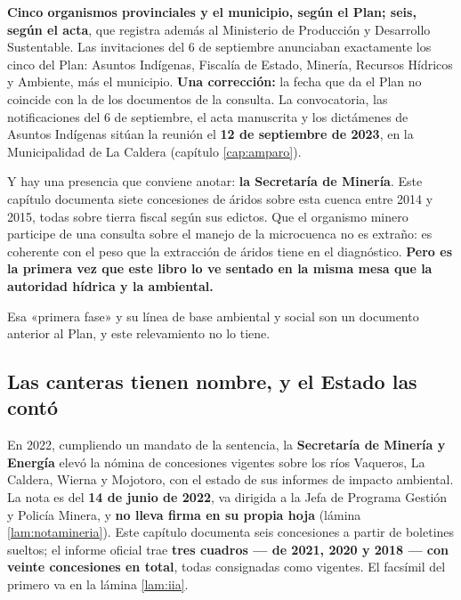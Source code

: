 \textbf{Cinco organismos provinciales y el municipio, según el Plan; seis, según el acta}, que registra además al Ministerio de Producción y Desarrollo Sustentable. Las invitaciones del 6 de septiembre anunciaban exactamente los cinco del Plan: Asuntos Indígenas, Fiscalía de Estado, Minería, Recursos Hídricos y Ambiente, más el municipio. \textbf{Una corrección:} la fecha que da el Plan no coincide con la de los documentos de la consulta. La convocatoria, las notificaciones del 6 de septiembre, el acta manuscrita y los dictámenes de Asuntos Indígenas sitúan la reunión el \textbf{12 de septiembre de 2023}, en la Municipalidad de La Caldera (capítulo \ref{cap:amparo}).

Y hay una presencia que conviene anotar: \textbf{la Secretaría de Minería}. Este capítulo
documenta siete concesiones de áridos sobre esta cuenca entre 2014 y 2015, todas sobre tierra fiscal según sus edictos. Que el organismo minero participe de una consulta sobre el manejo de la
microcuenca no es extraño: es coherente con el peso que la extracción de áridos tiene en el
diagnóstico. \textbf{Pero es la primera vez que este libro lo ve sentado en la misma mesa que
la autoridad hídrica y la ambiental.}

Esa «primera fase» y su línea de base ambiental y social son un documento anterior al Plan,
y este relevamiento no lo tiene.

\subsection*{Las canteras tienen nombre, y el Estado las contó}

En 2022, cumpliendo un mandato de la sentencia, la \textbf{Secretaría de Minería y Energía}
elevó la nómina de concesiones vigentes sobre los ríos Vaqueros, La Caldera, Wierna y
Mojotoro, con el estado de sus informes de impacto ambiental. La nota es del \textbf{14 de
junio de 2022}, va dirigida a la Jefa de Programa Gestión y Policía Minera, y \textbf{no lleva
firma en su propia hoja} (lámina \ref{lam:notamineria}). Este capítulo documenta seis
concesiones a partir de boletines sueltos; el informe oficial trae \textbf{tres cuadros --- de
2021, 2020 y 2018 --- con veinte concesiones en total}, todas consignadas como vigentes. El
facsímil del primero va en la lámina \ref{lam:iia}.

